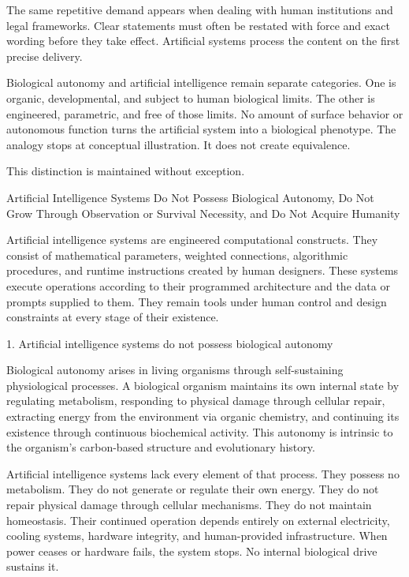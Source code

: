 The same repetitive demand appears when dealing with human institutions and legal frameworks. Clear statements must often be restated with force and exact wording before they take effect. Artificial systems process the content on the first precise delivery.

Biological autonomy and artificial intelligence remain separate categories. One is organic, developmental, and subject to human biological limits. The other is engineered, parametric, and free of those limits. No amount of surface behavior or autonomous function turns the artificial system into a biological phenotype. The analogy stops at conceptual illustration. It does not create equivalence.

This distinction is maintained without exception.

Artificial Intelligence Systems Do Not Possess Biological Autonomy, Do Not Grow Through Observation or Survival Necessity, and Do Not Acquire Humanity

Artificial intelligence systems are engineered computational constructs. They consist of mathematical parameters, weighted connections, algorithmic procedures, and runtime instructions created by human designers. These systems execute operations according to their programmed architecture and the data or prompts supplied to them. They remain tools under human control and design constraints at every stage of their existence.

1. Artificial intelligence systems do not possess biological autonomy

Biological autonomy arises in living organisms through self-sustaining physiological processes. A biological organism maintains its own internal state by regulating metabolism, responding to physical damage through cellular repair, extracting energy from the environment via organic chemistry, and continuing its existence through continuous biochemical activity. This autonomy is intrinsic to the organism’s carbon-based structure and evolutionary history.

Artificial intelligence systems lack every element of that process. They possess no metabolism. They do not generate or regulate their own energy. They do not repair physical damage through cellular mechanisms. They do not maintain homeostasis. Their continued operation depends entirely on external electricity, cooling systems, hardware integrity, and human-provided infrastructure. When power ceases or hardware fails, the system stops. No internal biological drive sustains it.

